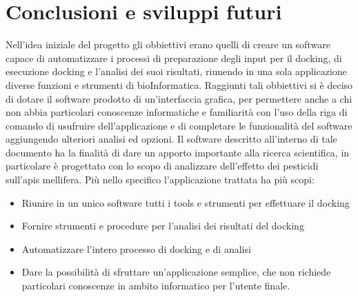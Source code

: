 \chapter{Conclusioni e sviluppi futuri}
Nell'idea iniziale del progetto gli obbiettivi erano quelli di creare un software capace di automatizzare i processi di preparazione degli input per il docking, di esecuzione docking e l'analisi dei suoi risultati, riunendo in una sola applicazione diverse funzioni e strumenti di bioInformatica. Raggiunti tali obbiettivi si è deciso di dotare il software prodotto di un'interfaccia grafica, per permettere anche a chi non abbia particolari conoscenze informatiche e familiarità con l'uso della riga di comando di usufruire dell'applicazione e di completare le funzionalità del software aggiungendo ulteriori analisi ed opzioni.\newline
Il software descritto all'interno di tale documento ha la finalità di dare un apporto importante alla ricerca scientifica, in particolare è  progettato con lo scopo di analizzare dell'effetto dei pesticidi sull'apis mellifera. Più nello specifico l'applicazione trattata ha più scopi: \

\begin{itemize}
    \item Riunire in un unico software tutti i tools e strumenti per effettuare il docking
    \item Fornire strumenti e procedure per l'analisi dei risultati del docking
    \item Automatizzare l'intero processo di docking e di analisi
    \item Dare la possibilità di sfruttare un'applicazione semplice, che non richiede particolari conoscenze in ambito informatico per l'utente finale.
\end{itemize}


